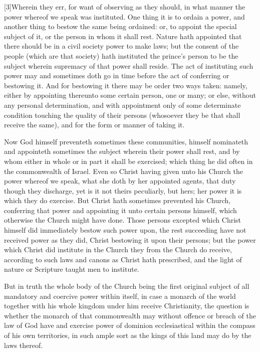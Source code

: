 [3]Wherein they err, for want of observing as they should, in what manner the power whereof we speak was instituted. One thing it is to ordain a power, and another thing to bestow the same being ordained: or, to appoint the special subject of it, or the person in whom it shall rest. Nature hath appointed that there should be in a civil society power to make laws; but the consent of the people (which are that society) hath instituted the prince’s person to be the subject wherein supremacy of that power shall reside. The act of instituting  such power may and sometimes doth go in time before the act of conferring or bestowing it. And for bestowing it there may be order two ways taken: namely, either by appointing thereunto some certain person, one or many; or else, without any personal determination, and with appointment only of some determinate condition touching the quality of their persons (whosoever they be that shall receive the same), and for the form or manner of taking it.

Now God himself preventeth sometimes these communities, himself nominateth and appointeth sometimes the subject wherein their power shall rest, and by whom either in whole or in part it shall be exercised; which thing he did often in the commonwealth of Israel. Even so Christ having given unto his Church the power whereof we speak, what she doth by her appointed agents, that duty though they discharge, yet is it not theirs peculiarly, but hers; her power it is which they do exercise. But Christ hath sometimes prevented his Church, conferring that power and appointing it unto certain persons himself, which otherwise the Church might have done. Those persons excepted which Christ himself did immediately bestow such power upon, the rest succeeding have not received power as they did, Christ bestowing it upon their persons; but the power which Christ did institute in the Church they from the Church do receive, according to such laws and canons as Christ hath prescribed, and the light of nature or Scripture taught men to institute.

But in truth the whole body of the Church being the first original subject of all mandatory and coercive power within itself, in case a monarch of the world together with his whole kingdom under him receive Christianity, the question is whether the monarch of that commonwealth may without offence or breach of the law of God have and exercise power of dominion ecclesiastical within the compass of his own territories, in such ample sort as the kings of this land may do by the laws thereof.

